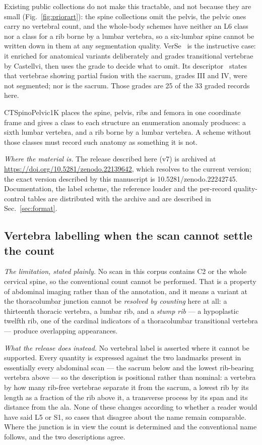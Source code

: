\documentclass[aapm,mph,amsmath,amssymb,reprint,linenumbers]{revtex4-2}
\newcommand{\datasetdoi}{10.5281/zenodo.22139642}
\newcommand{\datasetversiondoi}{10.5281/zenodo.22242745}
\newcommand{\datasetversion}{v7}
\begin{document}
Existing public collections do not make this tractable, and not because they are small
(Fig.~\ref{fig:priorart}): the spine collections omit the pelvis, the pelvic ones carry no
vertebral count, and the whole-body schemes have neither an L6 class nor a class for a rib
borne by a lumbar vertebra, so a six-lumbar spine cannot be written down in them at any
segmentation quality. VerSe~\cite{verse2021} is the instructive case: it enriched for anatomical variants
deliberately and grades transitional vertebrae by Castellvi, then uses the grade to decide
what to omit. Its descriptor~\cite{versedata2021} states that vertebrae showing partial
fusion with the sacrum, grades III and IV, were not segmented; nor is the sacrum. Those
grades are 25 of the 33 graded records here.

CTSpinoPelvic1K places the spine, pelvis, ribs and femora in one coordinate frame and gives
a class to each structure an enumeration anomaly produces: a sixth lumbar vertebra, and a
rib borne by a lumbar vertebra. A scheme without those classes must record such anatomy as
something it is not.

\emph{Where the material is.} The release described here (\datasetversion) is archived at
\url{https://doi.org/\datasetdoi}, which resolves to the current version; the exact version
described by this manuscript is \datasetversiondoi. Documentation, the label scheme, the
reference loader and the per-record quality-control tables are distributed with the archive
and are described in Sec.~\ref{sec:format}.

\subsection{Vertebra labelling when the scan cannot settle the count}

\emph{The limitation, stated plainly.} No scan in this corpus contains C2 or the whole
cervical spine, so the conventional count cannot be performed. That is a property of
abdominal imaging rather than of the annotation, and it means a variant at the thoracolumbar
junction cannot be \emph{resolved by counting} here at all: a thirteenth thoracic vertebra, a
lumbar rib, and a \emph{stump rib} --- a hypoplastic twelfth rib, one of the cardinal
indicators of a thoracolumbar transitional vertebra --- produce overlapping appearances.

\emph{What the release does instead.} No vertebral label is asserted where it cannot be
supported. Every quantity is expressed against the two landmarks present in essentially
every abdominal scan --- the sacrum below and the lowest rib-bearing vertebra above --- so
the description is positional rather than nominal: a vertebra by how many rib-free vertebrae
separate it from the sacrum, a lowest rib by its length as a fraction of the rib above it, a
transverse process by its span and its distance from the ala. None of these changes according
to whether a reader would have said L5 or S1, so cases that disagree about the name remain
comparable. Where the junction is in view the count is determined and the conventional name
follows, and the two descriptions agree.
\end{document}
